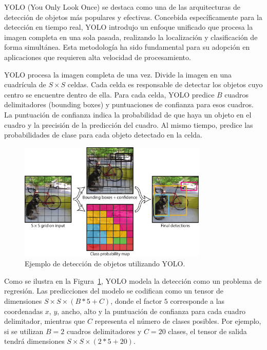 \documentclass[11pt,spanish,listoffigures,listoftables]{tfgetsinf}
\begin{document}
YOLO (You Only Look Once) se destaca como una de las arquitecturas de detección de objetos más populares y efectivas. Concebida específicamente para la detección en tiempo real, YOLO introdujo un enfoque unificado que procesa la imagen completa en una sola pasada, realizando la localización y clasificación de forma simultánea. Esta metodología ha sido fundamental para su adopción en aplicaciones que requieren alta velocidad de procesamiento.

YOLO procesa la imagen completa de una vez. Divide la imagen en una cuadrícula de $S \times S$ celdas. Cada celda es responsable de detectar los objetos cuyo centro se encuentre dentro de ella. Para cada celda, YOLO predice $B$ cuadros delimitadores (bounding boxes) y puntuaciones de confianza para esos cuadros. La puntuación de confianza indica la probabilidad de que haya un objeto en el cuadro y la precisión de la predicción del cuadro. Al mismo tiempo, predice las probabilidades de clase para cada objeto detectado en la celda.

\begin{figure}[H]
   \centering
   \includegraphics[width=0.8\textwidth]{images/estado_del_arte/yolo_detections_example.png}
   \caption{Ejemplo de detección de objetos utilizando YOLO.}
   \label{fig:yolo_detections_example}
\end{figure}

Como se ilustra en la Figura~\ref{fig:yolo_detections_example}\cite{redmon2016lookonceunifiedrealtime}, YOLO modela la detección como un problema de regresión. Las predicciones del modelo se codifican como un tensor de dimensiones $S \times S \times (B * 5 + C)$, donde el factor $5$ corresponde a las coordenadas $x$, $y$, ancho, alto y la puntuación de confianza para cada cuadro delimitador, mientras que $C$ representa el número de clases posibles. Por ejemplo, si se utilizan $B=2$ cuadros delimitadores y $C=20$ clases, el tensor de salida tendrá dimensiones $S \times S \times (2 * 5 + 20)$. 
\end{document}
